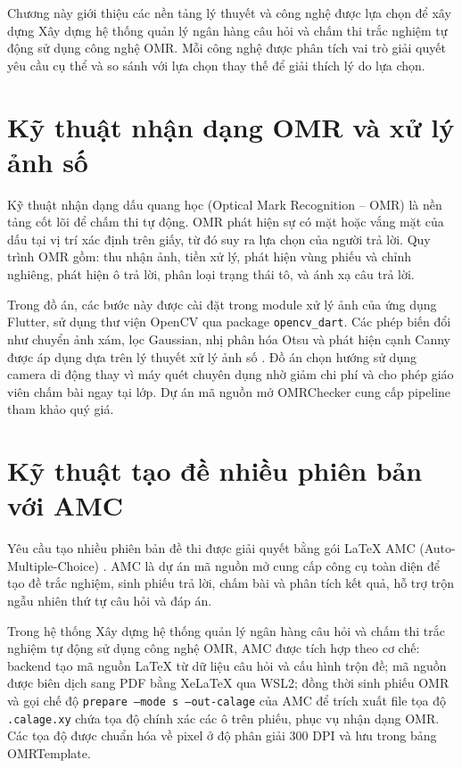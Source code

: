 ﻿\documentclass[../DoAn.tex]{subfiles}
\begin{document}
Chương này giới thiệu các nền tảng lý thuyết và công nghệ được lựa chọn để xây dựng Xây dựng hệ thống quản lý ngân hàng câu hỏi và chấm thi trắc nghiệm tự động sử dụng công nghệ OMR. Mỗi công nghệ được phân tích vai trò giải quyết yêu cầu cụ thể và so sánh với lựa chọn thay thế để giải thích lý do lựa chọn.

\section{Kỹ thuật nhận dạng OMR và xử lý ảnh số}
\label{section:3.1}

Kỹ thuật nhận dạng dấu quang học (Optical Mark Recognition -- OMR) là nền tảng cốt lõi để chấm thi tự động. OMR phát hiện sự có mặt hoặc vắng mặt của dấu tại vị trí xác định trên giấy, từ đó suy ra lựa chọn của người trả lời. Quy trình OMR gồm: thu nhận ảnh, tiền xử lý, phát hiện vùng phiếu và chỉnh nghiêng, phát hiện ô trả lời, phân loại trạng thái tô, và ánh xạ câu trả lời.

Trong đồ án, các bước này được cài đặt trong module xử lý ảnh của ứng dụng Flutter, sử dụng thư viện OpenCV \cite{bradski2000opencv} qua package \texttt{opencv\_dart}. Các phép biến đổi như chuyển ảnh xám, lọc Gaussian, nhị phân hóa Otsu và phát hiện cạnh Canny được áp dụng dựa trên lý thuyết xử lý ảnh số \cite{gonzalez2018digital}. Đồ án chọn hướng sử dụng camera di động thay vì máy quét chuyên dụng nhờ giảm chi phí và cho phép giáo viên chấm bài ngay tại lớp. Dự án mã nguồn mở OMRChecker \cite{omrchecker} cung cấp pipeline tham khảo quý giá.

\section{Kỹ thuật tạo đề nhiều phiên bản với AMC}
\label{section:3.2}

Yêu cầu tạo nhiều phiên bản đề thi được giải quyết bằng gói LaTeX AMC (Auto-Multiple-Choice) \cite{amcdoc}. AMC là dự án mã nguồn mở cung cấp công cụ toàn diện để tạo đề trắc nghiệm, sinh phiếu trả lời, chấm bài và phân tích kết quả, hỗ trợ trộn ngẫu nhiên thứ tự câu hỏi và đáp án.

Trong hệ thống Xây dựng hệ thống quản lý ngân hàng câu hỏi và chấm thi trắc nghiệm tự động sử dụng công nghệ OMR, AMC được tích hợp theo cơ chế: backend tạo mã nguồn LaTeX từ dữ liệu câu hỏi và cấu hình trộn đề; mã nguồn được biên dịch sang PDF bằng XeLaTeX qua WSL2; đồng thời sinh phiếu OMR và gọi chế độ \texttt{prepare --mode s --out-calage} của AMC để trích xuất file tọa độ \texttt{.calage.xy} chứa tọa độ chính xác các ô trên phiếu, phục vụ nhận dạng OMR. Các tọa độ được chuẩn hóa về pixel ở độ phân giải 300 DPI và lưu trong bảng OMRTemplate.
\end{document}
